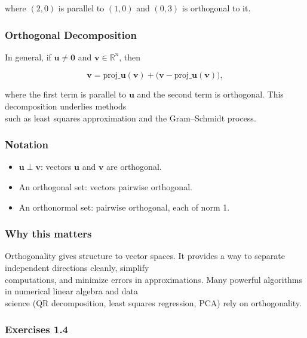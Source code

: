 \documentclass[
  12pt,
  a4paper,
]{article}
\begin{document}
where \((2,0)\) is parallel to \((1,0)\) and \((0,3)\) is orthogonal to
it.

\subsubsection{Orthogonal Decomposition}\label{orthogonal-decomposition}

In general, if \(\mathbf{u} \neq \mathbf{0}\) and
\(\mathbf{v} \in \mathbb{R}^n\), then

\[\mathbf{v} = \text{proj}\_{\mathbf{u}}(\mathbf{v}) + \big(\mathbf{v} - \text{proj}\_{\mathbf{u}}(\mathbf{v})\big),\]

where the first term is parallel to \(\mathbf{u}\) and the second term
is orthogonal. This decomposition underlies methods\\
such as least squares approximation and the Gram--Schmidt process.

\subsubsection{Notation}\label{notation-4}

\begin{itemize}
\item
  \(\mathbf{u} \perp \mathbf{v}\): vectors \(\mathbf{u}\) and
  \(\mathbf{v}\) are orthogonal.
\item
  An orthogonal set: vectors pairwise orthogonal.
\item
  An orthonormal set: pairwise orthogonal, each of norm 1.
\end{itemize}

\subsubsection{Why this matters}\label{why-this-matters-3}

Orthogonality gives structure to vector spaces. It provides a way to
separate independent directions cleanly, simplify\\
computations, and minimize errors in approximations. Many powerful
algorithms in numerical linear algebra and data\\
science (QR decomposition, least squares regression, PCA) rely on
orthogonality.

\subsubsection{Exercises 1.4}\label{exercises-14}
\end{document}
